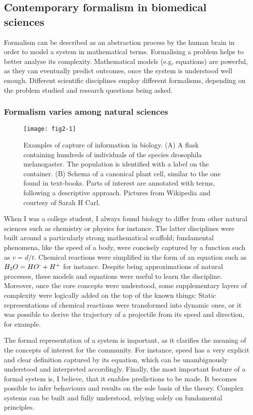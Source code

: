 \subsection{Contemporary formalism in biomedical sciences}

Formalism can be described as an abstraction process by the human brain in order to model a system in mathematical terms. Formalising a problem helps to better analyse its complexity. Mathematical models (e.g, equations) are powerful, as they can eventually predict outcomes, once the system is understood well enough. Different scientific disciplines employ different formalisms, depending on the problem studied and research questions being asked.

\subsubsection{Formalism varies among natural sciences}

\begin{figure}[ht]
    \centering
    \texttt{[image: fig2-1]}
    \caption{Examples of capture of information in biology. (A) A flask containing hundreds of individuals of the species drosophila melanogaster. The population is identified with a label on the container. (B) Schema of a  canonical plant cell, similar to the one found in text-books. Parts of interest are annotated with terms, following a descriptive approach. Pictures from Wikipedia and courtesy of Sarah H Carl.}
    \label{fig2-1}
\end{figure}

When I was a college student, I always found biology to differ from other natural sciences such as chemistry or physics for instance. The latter disciplines were built around a particularly strong mathematical scaffold; fundamental phenomena, like the speed of a body, were concisely captured by a function such as $ v=d/t $. Chemical reactions were simplified in the form of an equation such as $ H_{2}O = HO \textsuperscript{-} + H \textsuperscript{+} $ for instance. Despite being approximations of natural processes, these models and equations were useful to learn the discipline. Moreover, once the core concepts were understood, some supplementary layers of complexity were logically added on the top of the known things: Static representations of chemical reactions were transformed into dynamic ones, or it was possible to derive the trajectory of a projectile from its speed and direction, for example.

The formal representation of a system is important, as it clarifies the meaning of the concepts of interest for the community. For instance, speed has a very explicit and clear definition captured by its equation, which can be unambiguously understood and interpreted accordingly. Finally, the most important feature of a formal system is, I believe, that it enables predictions to be made. It becomes possible to infer behaviours and results on the sole basis of the theory. Complex systems can be built and fully understood, relying solely on fundamental principles.

